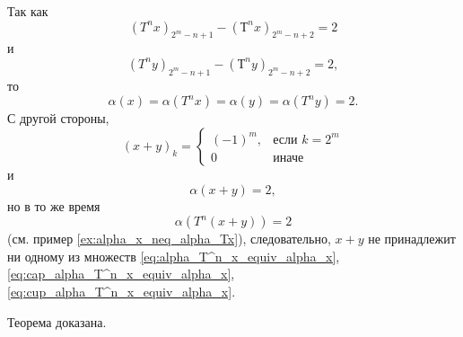 Так как
\begin{equation}
	(T^n x)_{2^m-n+1} - (Т^n x)_{2^m-n+2} = 2
\end{equation}
и
\begin{equation}
	(T^n y)_{2^m-n+1} - (Т^n y)_{2^m-n+2} = 2
	,
\end{equation}
то
\begin{equation}
	\alpha(x) = \alpha(T^n x) = \alpha(y) = \alpha(T^n y) = 2
	.
\end{equation}
С другой стороны,
\begin{equation}
	(x+y)_k = \begin{cases}
		(-1)^m,  & \mbox{если } k = 2^m     \\
		0        & \mbox{иначе }
	\end{cases}
\end{equation}
и
\begin{equation}
	\alpha(x+y) = 2
	,
\end{equation}
но в то же время
\begin{equation}
	\alpha(T^n(x+y)) = 2
\end{equation}
(см. пример \ref{ex:alpha_x_neq_alpha_Tx}),
следовательно, $x+y$ не принадлежит ни одному из множеств
\eqref{eq:alpha_T^n_x_equiv_alpha_x}, \eqref{eq:cap_alpha_T^n_x_equiv_alpha_x}, \eqref{eq:cup_alpha_T^n_x_equiv_alpha_x}.

Теорема доказана.



